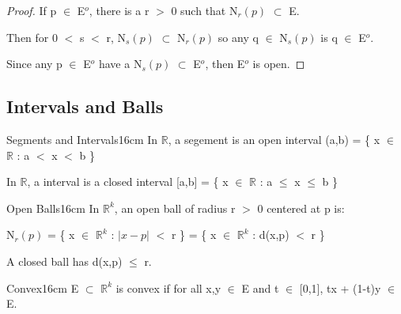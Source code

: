 	\begin{proof}
		If p $\in$ E$^o$, there is a r $>$ 0 such that
		N$_r(p)$ $\subset$ E.

		Then for 0 $<$ s $<$ r, N$_s(p)$ $\subset$ N$_r(p)$
		so any q $\in$ N$_s(p)$ is q $\in$ E$^o$.

		Since any p $\in$ E$^o$ have a N$_s(p)$ $\subset$ E$^o$,
		then E$^o$ is open.
	\end{proof}

	\vspace{0.5cm}





\subsection{ Intervals and Balls } 

	\begin{definition}{Segments and Intervals}{16cm}
		In $\mathbb{R}$, a {\color{lblue} segement} is an open interval
		(a,b) = \{ x $\in$ $\mathbb{R}$ : a $<$ x $<$ b \}

		In $\mathbb{R}$, a {\color{lblue} interval} is a closed interval
		[a,b] = \{ x $\in$ $\mathbb{R}$ : a $\leq$ x $\leq$ b \}
	\end{definition}

	\vspace{0.5cm}



	\begin{definition}{Open Balls}{16cm}
		In $\mathbb{R}^k$, an {\color{lblue} open ball} of radius
		r $>$ 0 centered at p is:

		\qquad N$_r(p)$ = \{ x $\in$ $\mathbb{R}^k$ : $|x-p|$ $<$ r \}
		= \{ x $\in$ $\mathbb{R}^k$ : d(x,p) $<$ r \}

		A {\color{lblue} closed ball} has d(x,p) $\leq$ r.
	\end{definition}
	
	\vspace{0.5cm}



	\begin{definition}{Convex}{16cm}
		E $\subset$ $\mathbb{R}^k$ is {\color{lblue} convex} if for all
		x,y $\in$ E and t $\in$ [0,1], tx + (1-t)y $\in$ E.
	\end{definition}
	
	\vspace{0.5cm}




